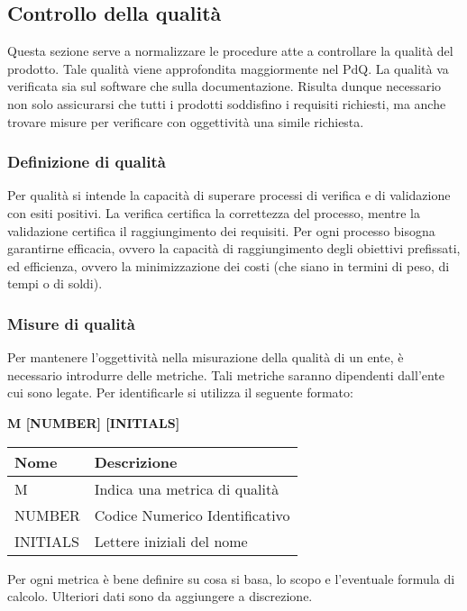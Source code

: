 \subsection{Controllo della qualità}
Questa sezione serve a normalizzare le procedure atte a controllare la qualità del prodotto.
Tale qualità viene approfondita maggiormente nel PdQ. \newline
La qualità va verificata sia sul software che sulla documentazione. \newline
Risulta dunque necessario non solo assicurarsi che tutti i prodotti soddisfino i requisiti richiesti, 
ma anche trovare misure per verificare con oggettività una simile richiesta.
\subsubsection{Definizione di qualità}
Per qualità si intende la capacità di superare processi di verifica e di validazione con esiti positivi. \newline 
La verifica certifica la correttezza del processo, mentre la validazione certifica il raggiungimento dei requisiti. \newline
Per ogni processo bisogna garantirne efficacia, ovvero la capacità di raggiungimento degli obiettivi 
prefissati, ed efficienza, ovvero la minimizzazione dei costi (che siano in termini di peso, di tempi o di soldi).
\subsubsection{Misure di qualità}
Per mantenere l'oggettività nella misurazione della qualità di un ente, è necessario introdurre delle metriche.
Tali metriche saranno dipendenti dall'ente cui sono legate. \newline
Per identificarle si utilizza il seguente formato:
\begin{center}
	\textbf{M [NUMBER] [INITIALS]}
\end{center}
\renewcommand{\arraystretch}{1.8} %
    \begin{tabular}{ |m{7em}|m{30em}| }
        \hline
        \textbf{Nome} & \textbf{Descrizione} \\
        \hline
            M & Indica una metrica di qualità \\
        \hline
            NUMBER & Codice Numerico Identificativo \\
        \hline
            INITIALS & Lettere iniziali del nome \\
        \hline
    \end{tabular} \newline \newline
Per ogni metrica è bene definire su cosa si basa, lo scopo e l'eventuale formula di calcolo. Ulteriori dati sono da aggiungere
a discrezione.
